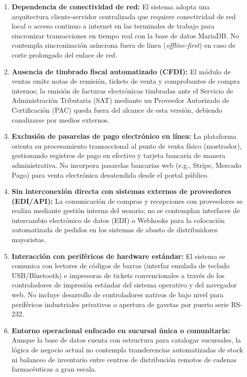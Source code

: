 \begin{enumerate}
    \item \textbf{Dependencia de conectividad de red:} El sistema adopta una arquitectura cliente-servidor centralizada que requiere conectividad de red local o acceso continuo a internet en las terminales de trabajo para sincronizar transacciones en tiempo real con la base de datos MariaDB. No contempla sincronización asíncrona fuera de línea (\textit{offline-first}) en caso de corte prolongado del enlace de red.
    \item \textbf{Ausencia de timbrado fiscal automatizado (CFDI):} El módulo de ventas emite notas de remisión, tickets de venta y comprobantes de compra internos; la emisión de facturas electrónicas timbradas ante el Servicio de Administración Tributaria (SAT) mediante un Proveedor Autorizado de Certificación (PAC) queda fuera del alcance de esta versión, debiendo canalizarse por medios externos.
    \item \textbf{Exclusión de pasarelas de pago electrónico en línea:} La plataforma orienta su procesamiento transaccional al punto de venta físico (mostrador), gestionando registros de pago en efectivo y tarjeta bancaria de manera administrativa. No incorpora pasarelas bancarias web (e.g., Stripe, Mercado Pago) para venta electrónica desatendida desde el portal público.
    \item \textbf{Sin interconexión directa con sistemas externos de proveedores (EDI/API):} La comunicación de compras y recepciones con proveedores se realiza mediante gestión interna del usuario; no se contemplan interfaces de intercambio electrónico de datos (EDI) o Webhooks para la colocación automatizada de pedidos en los sistemas de abasto de distribuidores mayoristas.
    \item \textbf{Interacción con periféricos de hardware estándar:} El sistema se comunica con lectores de códigos de barras (interfaz emulada de teclado USB/Bluetooth) e impresoras de tickets convencionales a través de los controladores de impresión estándar del sistema operativo y del navegador web. No incluye desarrollo de controladores nativos de bajo nivel para periféricos industriales privativos o apertura de gavetas por puerto serie RS-232.
    \item \textbf{Entorno operacional enfocado en sucursal única o comunitaria:} Aunque la base de datos cuenta con estructura para catalogar sucursales, la lógica de negocio actual no contempla transferencias automatizadas de stock ni balanceo de inventario entre centros de distribución remotos de cadenas farmacéuticas a gran escala.
\end{enumerate}

